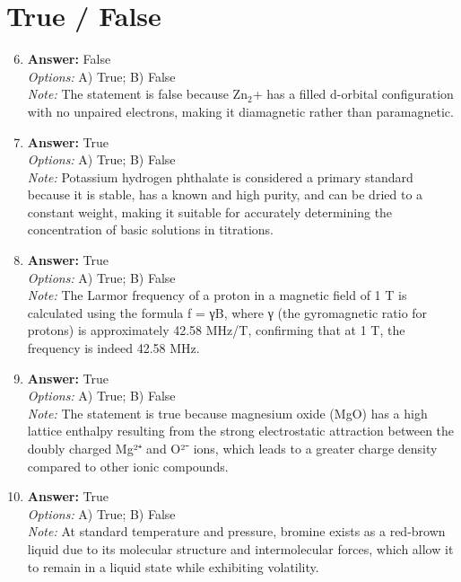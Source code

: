 \documentclass[12pt]{article}
\begin{document}
\section*{True / False}
\begin{enumerate}[label=\arabic*.]
\setcounter{enumi}{5}
\item \textbf{Answer:} False
\\ \textit{Options:} A) True; B) False
\\ \textit{Note:} The statement is false because Zn$_{2}$+ has a filled d-orbital configuration with no unpaired electrons, making it diamagnetic rather than paramagnetic.
\item \textbf{Answer:} True
\\ \textit{Options:} A) True; B) False
\\ \textit{Note:} Potassium hydrogen phthalate is considered a primary standard because it is stable, has a known and high purity, and can be dried to a constant weight, making it suitable for accurately determining the concentration of basic solutions in titrations.
\item \textbf{Answer:} True
\\ \textit{Options:} A) True; B) False
\\ \textit{Note:} The Larmor frequency of a proton in a magnetic field of 1 T is calculated using the formula f = γB, where γ (the gyromagnetic ratio for protons) is approximately 42.58 MHz/T, confirming that at 1 T, the frequency is indeed 42.58 MHz.
\item \textbf{Answer:} True
\\ \textit{Options:} A) True; B) False
\\ \textit{Note:} The statement is true because magnesium oxide (MgO) has a high lattice enthalpy resulting from the strong electrostatic attraction between the doubly charged Mg²⁺ and O²⁻ ions, which leads to a greater charge density compared to other ionic compounds.
\item \textbf{Answer:} True
\\ \textit{Options:} A) True; B) False
\\ \textit{Note:} At standard temperature and pressure, bromine exists as a red-brown liquid due to its molecular structure and intermolecular forces, which allow it to remain in a liquid state while exhibiting volatility.
\end{enumerate}
\end{document}
